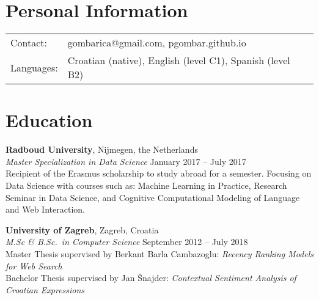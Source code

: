 \documentclass[margin,line]{resume}
\begin{document}
\begin{resume}

\section{\mysidestyle Personal Information}

\begin{tabular}{@{}ll@{}}
Contact: & gombarica@gmail.com, pgombar.github.io \\
Languages: & Croatian (native), English (level C1), Spanish (level B2) \\
\end{tabular}

\section{\mysidestyle Education}

\textbf{Radboud University}, Nijmegen, the Netherlands \vspace{1mm}\\\vspace{1mm}%
\textsl{Master Specialization in Data Science} \hfill January 2017 -- July 2017\\%
Recipient of the Erasmus scholarship to study abroad for a semester. Focusing on Data Science with courses such as: Machine Learning in Practice, Research Seminar in Data Science, and Cognitive Computational Modeling of Language and Web Interaction. \\
\vspace{-3mm}\hspace{-1mm}\hfill%

\vspace{-2mm}
\textbf{University of Zagreb}, Zagreb, Croatia \vspace{1mm}\\\vspace{1mm}%
\textsl{M.Sc \& B.Sc.\ in Computer Science} \hfill September 2012 -- July 2018\\%
Master Thesis supervised by Berkant Barla Cambazoglu: \textit{Recency Ranking Models for Web Search} \\
Bachelor Thesis supervised by Jan \v{S}najder: \textit{Contextual Sentiment Analysis of Croatian Expressions}


\end{resume}
\end{document}
